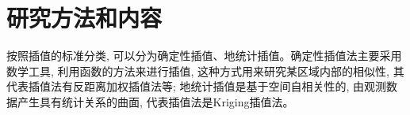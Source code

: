 \section{研究方法和内容}
按照插值的标准分类, 可以分为确定性插值、地统计插值\textsuperscript{\cite{李海涛2019空间插值分析算法综述}}。确定性插值法主要采用数学工具, 利用函数的方法来进行插值, 这种方式用来研究某区域内部的相似性, 其代表插值法有反距离加权插值法等; 地统计插值是基于空间自相关性的, 由观测数据产生具有统计关系的曲面, 代表插值法是Kriging插值法。
